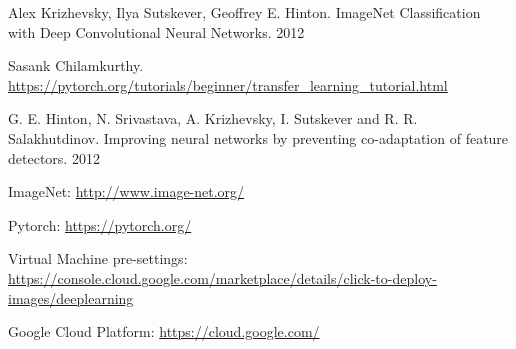 \documentclass{article}
\begin{document}
\begin{thebibliography}{1}
	Alex Krizhevsky, Ilya Sutskever, Geoffrey E. Hinton. ImageNet Classification with Deep Convolutional
	Neural Networks. 2012

	Sasank Chilamkurthy.
	\url{https://pytorch.org/tutorials/beginner/transfer_learning_tutorial.html}
	
	G. E. Hinton, N. Srivastava, A. Krizhevsky, I. Sutskever and R. R. Salakhutdinov.
	Improving neural networks by preventing co-adaptation of feature detectors. 2012
	
	ImageNet: \url{http://www.image-net.org/}
	
	Pytorch: \url{https://pytorch.org/}
	
	Virtual Machine pre-settings: \url{https://console.cloud.google.com/marketplace/details/click-to-deploy-images/deeplearning}
	
	Google Cloud Platform: \url{https://cloud.google.com/}

	
\end{thebibliography}
\end{document}
